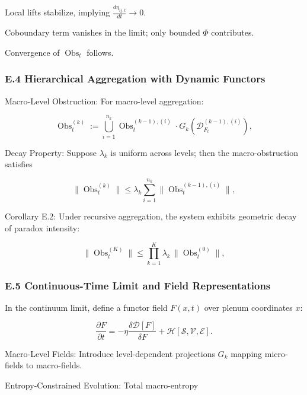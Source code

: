 \documentclass[12pt]{article}
\theoremstyle{plain}
\begin{document}
Local lifts stabilize, implying \(\frac{d \eta_{ij,t}}{dt} \to 0\).

Coboundary term vanishes in the limit; only bounded \(\Phi\) contributes.

Convergence of \(\operatorname{Obs}_t\) follows.

\subsubsection*{E.4 Hierarchical Aggregation with Dynamic Functors}

Macro-Level Obstruction: For macro-level aggregation:

\begin{equation}
\operatorname{Obs}_t^{(k)} := \bigcup_{i=1}^{n_k} \operatorname{Obs}_t^{(k-1), (i)} \cdot G_k(\mathcal{D}_{F_t}^{(k-1), (i)}),
\end{equation}

Decay Property: Suppose \(\lambda_k\) is uniform across levels; then the macro-obstruction satisfies

\begin{equation}
\|\operatorname{Obs}_t^{(k)}\| \leq \lambda_k \sum_{i=1}^{n_k} \|\operatorname{Obs}_t^{(k-1), (i)}\|,
\end{equation}

Corollary E.2: Under recursive aggregation, the system exhibits geometric decay of paradox intensity:

\begin{equation}
\|\operatorname{Obs}_t^{(K)}\| \leq \prod_{k=1}^K \lambda_k \, \|\operatorname{Obs}_t^{(0)}\|,
\end{equation}

\subsubsection*{E.5 Continuous-Time Limit and Field Representations}

In the continuum limit, define a functor field \(F(x,t)\) over plenum coordinates \(x\):

\begin{equation}
\frac{\partial F}{\partial t} = - \eta \frac{\delta \mathcal{D}[F]}{\delta F} + \mathcal{H}[\mathcal{S}, \mathcal{V}, \mathcal{E}].
\end{equation}

Macro-Level Fields: Introduce level-dependent projections \(G_k\) mapping micro-fields to macro-fields.

Entropy-Constrained Evolution: Total macro-entropy
\end{document}
